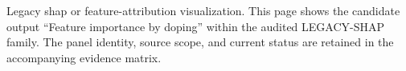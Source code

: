 Legacy shap or feature-attribution visualization. This page shows the candidate output ``Feature importance by doping'' within the audited LEGACY-SHAP family. The panel identity, source scope, and current status are retained in the accompanying evidence matrix.
